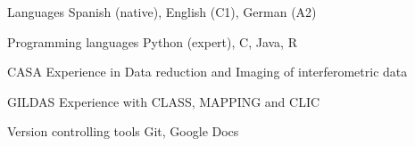 

\begin{cvskills}

  \cvskill
    {Languages} %
    {Spanish (native), English (C1), German (A2)} %
    

  \cvskill
    {Programming languages} %
    {Python (expert), C, Java, R} %


  \cvskill
    {CASA} %
    {Experience in Data reduction and Imaging of interferometric data} %


  \cvskill
    {GILDAS} %
    {Experience with CLASS, MAPPING and CLIC} %


  \cvskill
    {Version controlling tools} %
    {Git, Google Docs} %


\end{cvskills}
